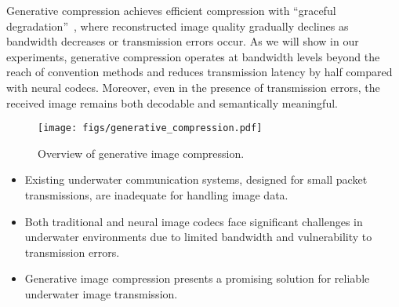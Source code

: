 Generative compression achieves efficient compression with
``graceful degradation''~\cite{santurkar2018generative},
where reconstructed image quality gradually declines
as bandwidth decreases or transmission errors occur.
As we will show in our experiments, generative compression operates
at bandwidth levels beyond the reach of convention methods and reduces
transmission latency by half compared with neural codecs.
Moreover, even in the presence of transmission errors,
the received image remains both decodable and semantically meaningful.










\begin{figure}[t]
    \centering
    \texttt{[image: figs/generative\_compression.pdf]}
    \caption{Overview of generative image compression.}
    \label{fig:semantic_compression}
\end{figure}




\begin{itemize}[topsep=2pt,noitemsep,leftmargin=*]
   \item Existing underwater communication systems, designed for small packet transmissions, are inadequate for handling image data.%
   \item Both traditional and neural image codecs face significant challenges in underwater environments due to limited bandwidth and vulnerability to transmission errors.
   \item Generative image compression presents a promising solution for reliable underwater image transmission.
\end{itemize}










